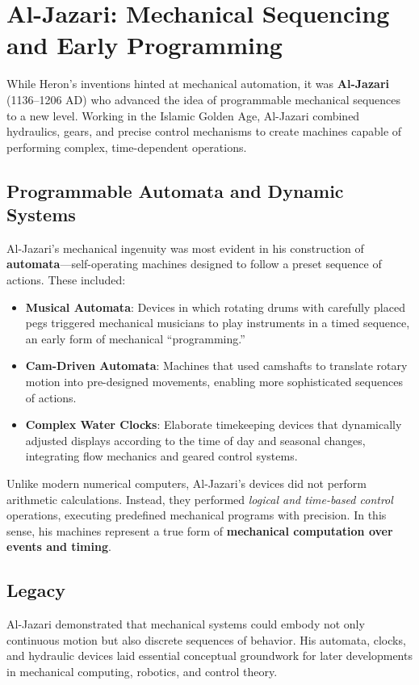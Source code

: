\section{Al-Jazari: Mechanical Sequencing and Early Programming}

While Heron's inventions hinted at mechanical automation, it was \textbf{Al-Jazari} (1136--1206 AD) who advanced the idea of programmable mechanical sequences to a new level. Working in the Islamic Golden Age, Al-Jazari combined hydraulics, gears, and precise control mechanisms to create machines capable of performing complex, time-dependent operations.

\subsection{Programmable Automata and Dynamic Systems}

Al-Jazari's mechanical ingenuity was most evident in his construction of \textbf{automata}---self-operating machines designed to follow a preset sequence of actions. These included:

\begin{itemize}
    \item \textbf{Musical Automata}: Devices in which rotating drums with carefully placed pegs triggered mechanical musicians to play instruments in a timed sequence, an early form of mechanical ``programming.''
    \item \textbf{Cam-Driven Automata}: Machines that used camshafts to translate rotary motion into pre-designed movements, enabling more sophisticated sequences of actions.
    \item \textbf{Complex Water Clocks}: Elaborate timekeeping devices that dynamically adjusted displays according to the time of day and seasonal changes, integrating flow mechanics and geared control systems.
\end{itemize}

Unlike modern numerical computers, Al-Jazari's devices did not perform arithmetic calculations. Instead, they performed \textit{logical and time-based control} operations, executing predefined mechanical programs with precision. In this sense, his machines represent a true form of \textbf{mechanical computation over events and timing}.

\subsection{Legacy}

Al-Jazari demonstrated that mechanical systems could embody not only continuous motion but also discrete sequences of behavior. His automata, clocks, and hydraulic devices laid essential conceptual groundwork for later developments in mechanical computing, robotics, and control theory.


